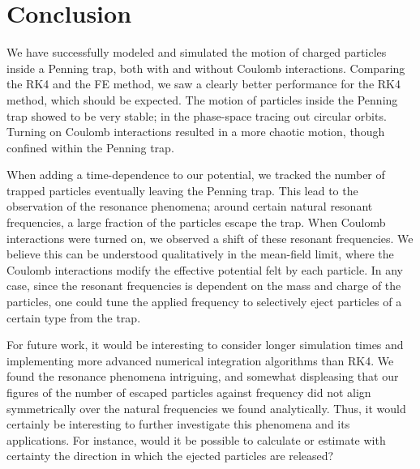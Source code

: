 \documentclass[english,notitlepage,reprint]{revtex4-2}  %
\begin{document}
\section{Conclusion}
We have successfully modeled and simulated the motion of charged particles inside a Penning trap, both with and without Coulomb interactions. Comparing the RK4 and the FE method, we saw a clearly better performance for the RK4 method, which should be expected. 
The motion of particles inside the Penning trap showed to be very stable; in the phase-space tracing out circular orbits. 
Turning on Coulomb interactions resulted in a more chaotic motion, though confined within the Penning trap.

When adding a time-dependence to our potential, we tracked the number of trapped particles eventually leaving the Penning trap. 
This lead to the observation of the resonance phenomena; around certain natural resonant frequencies, a large fraction of the particles escape the trap. 
When Coulomb interactions were turned on, we observed a shift of these resonant frequencies.
We believe this can be understood qualitatively in the mean-field limit, where the Coulomb interactions modify the effective potential felt by each particle.
In any case, since the resonant frequencies is dependent on the mass and charge of the particles, one could tune the applied frequency to selectively eject particles of a certain type from the trap.

For future work, it would be interesting to consider longer simulation times and implementing more advanced numerical integration algorithms than RK4. We found the resonance phenomena intriguing, and somewhat displeasing that our figures of the number of escaped particles against frequency did not align symmetrically over the natural frequencies we found analytically. Thus, it would certainly be interesting to further investigate this phenomena and its applications. For instance, would it be possible to calculate or estimate with certainty the direction in which the ejected particles are released?
\end{document}
